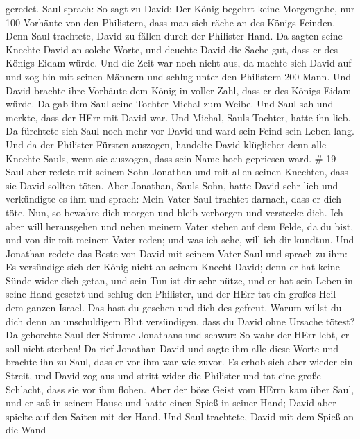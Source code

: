 geredet.  Saul sprach: So sagt zu David: Der König begehrt
keine Morgengabe, nur 100 Vorhäute von den Philistern, dass man sich
räche an des Königs Feinden. Denn Saul trachtete, David zu fällen durch
der Philister Hand.  Da sagten seine Knechte David an
solche Worte, und deuchte David die Sache gut, dass er des Königs Eidam
würde. Und die Zeit war noch nicht aus,  da machte sich
David auf und zog hin mit seinen Männern und schlug unter den Philistern
200 Mann. Und David brachte ihre Vorhäute dem König in voller Zahl, dass
er des Königs Eidam würde. Da gab ihm Saul seine Tochter Michal zum
Weibe.  Und Saul sah und merkte, dass der HErr mit David
war. Und Michal, Sauls Tochter, hatte ihn lieb.  Da
fürchtete sich Saul noch mehr vor David und ward sein Feind sein Leben
lang.  Und da der Philister Fürsten auszogen, handelte
David klüglicher denn alle Knechte Sauls, wenn sie auszogen, dass sein
Name hoch gepriesen ward. \# 19  Saul aber redete mit seinem
Sohn Jonathan und mit allen seinen Knechten, dass sie David sollten
töten. Aber Jonathan, Sauls Sohn, hatte David sehr lieb  und
verkündigte es ihm und sprach: Mein Vater Saul trachtet darnach, dass er
dich töte. Nun, so bewahre dich morgen und bleib verborgen und verstecke
dich.  Ich aber will herausgehen und neben meinem Vater
stehen auf dem Felde, da du bist, und von dir mit meinem Vater reden;
und was ich sehe, will ich dir kundtun.  Und Jonathan redete
das Beste von David mit seinem Vater Saul und sprach zu ihm: Es
versündige sich der König nicht an seinem Knecht David; denn er hat
keine Sünde wider dich getan, und sein Tun ist dir sehr nütze,
 und er hat sein Leben in seine Hand gesetzt und schlug den
Philister, und der HErr tat ein großes Heil dem ganzen Israel. Das hast
du gesehen und dich des gefreut. Warum willst du dich denn an
unschuldigem Blut versündigen, dass du David ohne Ursache tötest?
 Da gehorchte Saul der Stimme Jonathans und schwur: So wahr
der HErr lebt, er soll nicht sterben!  Da rief Jonathan
David und sagte ihm alle diese Worte und brachte ihn zu Saul, dass er
vor ihm war wie zuvor.  Es erhob sich aber wieder ein
Streit, und David zog aus und stritt wider die Philister und tat eine
große Schlacht, dass sie vor ihm flohen.  Aber der böse
Geist vom HErrn kam über Saul, und er saß in seinem Hause und hatte
einen Spieß in seiner Hand; David aber spielte auf den Saiten mit der
Hand.  Und Saul trachtete, David mit dem Spieß an die Wand
